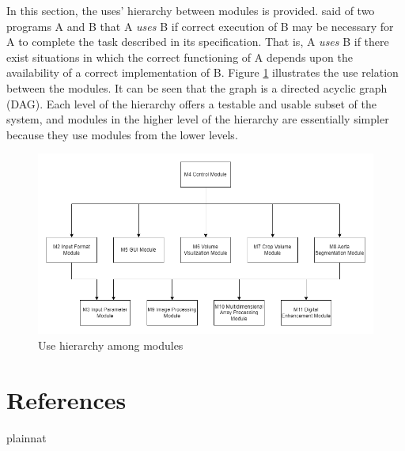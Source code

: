 \documentclass[12pt, titlepage]{article}
\begin{document}
In this section, the uses' hierarchy between modules is
provided. \citet{Parnas1978} said of two programs A and B that A {\em uses} B if
correct execution of B may be necessary for A to complete the task described in
its specification. That is, A {\em uses} B if there exist situations in which
the correct functioning of A depends upon the availability of a correct
implementation of B.  Figure \ref{FigUH} illustrates the use relation between
the modules. It can be seen that the graph is a directed acyclic graph
(DAG). Each level of the hierarchy offers a testable and usable subset of the
system, and modules in the higher level of the hierarchy are essentially simpler
because they use modules from the lower levels.

\begin{figure}[H]
\centering
\includegraphics[width=\textwidth]{UsesHierarchy.png}
\caption{Use hierarchy among modules}
\label{FigUH}
\end{figure}

\newpage
\section{References}

 {plainnat}

\end{document}
